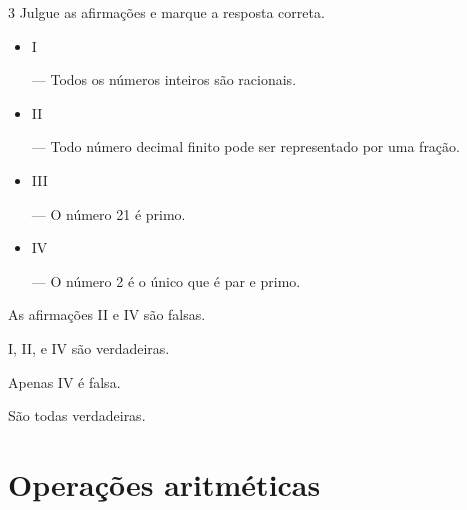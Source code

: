 

\num{3} Julgue as afirmações e marque a resposta correta.

\begin{itemize}
\item \parbox{4mm}{I} --- Todos os números inteiros são racionais.
\item \parbox{4mm}{II} --- Todo número decimal finito pode ser representado por uma fração.
\item \parbox{4mm}{III} --- O número 21 é primo.
\item \parbox{4mm}{IV} ---  O número 2 é o único que é par e primo.
\end{itemize}

\begin{escolha}[itemsep=0pt]
\item
  As afirmações II e IV são falsas.
\item
  I, II, e IV são verdadeiras.
\item
  Apenas IV é falsa.
\item
  São todas verdadeiras.
\end{escolha}



\chapter{Operações aritméticas}

